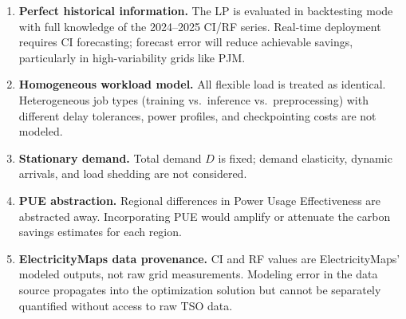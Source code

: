 \begin{enumerate}[leftmargin=1.5em]
  \item \textbf{Perfect historical information.}
        The LP is evaluated in backtesting mode with full knowledge of the 2024--2025 CI/RF series.
        Real-time deployment requires CI forecasting; forecast error will reduce achievable savings, particularly in high-variability grids like PJM.

  \item \textbf{Homogeneous workload model.}
        All flexible load is treated as identical.
        Heterogeneous job types (training vs.\ inference vs.\ preprocessing) with different delay tolerances, power profiles, and checkpointing costs are not modeled.

  \item \textbf{Stationary demand.}
        Total demand $D$ is fixed; demand elasticity, dynamic arrivals, and load shedding are not considered.

  \item \textbf{PUE abstraction.}
        Regional differences in Power Usage Effectiveness are abstracted away.
        Incorporating PUE would amplify or attenuate the carbon savings estimates for each region.

  \item \textbf{ElectricityMaps data provenance.}
        CI and RF values are ElectricityMaps' modeled outputs, not raw grid measurements.
        Modeling error in the data source propagates into the optimization solution but cannot be separately quantified without access to raw TSO data.
\end{enumerate}
